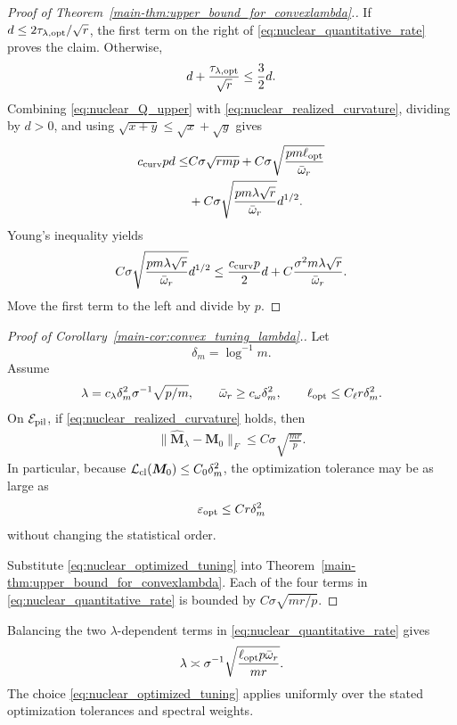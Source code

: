 \documentclass[numsec,webpdf,modern,large,namedate]{oup-authoring-template}
\theoremstyle{plain}
\theoremstyle{remark}
\newcommand{\M}{\bm{M}}
\newif\ifmarkchanges
\newenvironment{revision}{\begingroup\ifmarkchanges\color{red}\fi}{\endgroup}
\begin{document}
\begin{revision}
\begin{proof}[Proof of Theorem~\ref{main-thm:upper_bound_for_convexlambda}.]
If
$d\le2\tau_{\lambda,\rm opt}/\sqrt r$, the first term on the right of
\eqref{eq:nuclear_quantitative_rate} proves the claim.  Otherwise,
\[
 d+\frac{\tau_{\lambda,\rm opt}}{\sqrt r}
 \le
 \frac32d.
\]
Combining \eqref{eq:nuclear_Q_upper} with
\eqref{eq:nuclear_realized_curvature}, dividing by $d>0$, and using
$\sqrt{x+y}\le\sqrt x+\sqrt y$ gives
\begin{align*}
 c_{\rm curv}pd
 \le&
 C\sigma\sqrt{rmp}
 +
 C\sigma
 \sqrt{
 \frac{pm\ell_{\rm opt}}
 {\bar\omega_r}
 }\\
 &+
 C\sigma
 \sqrt{
 \frac{pm\lambda\sqrt r}
 {\bar\omega_r}
 }
 d^{1/2}.
\end{align*}
Young's inequality yields
\[
 C\sigma
 \sqrt{
 \frac{pm\lambda\sqrt r}
 {\bar\omega_r}
 }
 d^{1/2}
 \le
 \frac{c_{\rm curv}p}{2}d
 +
 C
 \frac{
 \sigma^2m\lambda\sqrt r
 }{
 \bar\omega_r
 }.
\]
Move the first term to the left and divide by $p$.
\end{proof}

\begin{proof}[Proof of Corollary~\ref{main-cor:convex_tuning_lambda}.]
Let
\[
 \delta_m=\log^{-1}m.
\]
Assume
\begin{align}
\label{eq:nuclear_optimized_tuning}
 \lambda
 =
 c_\lambda\delta_m^2
 \sigma^{-1}\sqrt{p/m},
 \qquad
 \bar\omega_r
 \ge
 c_\omega\delta_m^2,
 \qquad
 \ell_{\rm opt}
 \le
 C_\ell r\delta_m^2.
\end{align}
On $\mathcal E_{\rm pil}$, if
\eqref{eq:nuclear_realized_curvature} holds, then
\begin{align}
\label{eq:nuclear_conditional_rate}
 \|\widehat{\M}_\lambda-\M_0\|_F
 \le
 C\sigma\sqrt{\frac{mr}{p}}.
\end{align}
In particular, because
$\mathcal L_{\rm cl}(\M_0)\le C_0\delta_m^2$, the optimization tolerance may
be as large as
\begin{align}
\label{eq:nuclear_opt_tolerance}
 \varepsilon_{\rm opt}
 \le
 C r\delta_m^2
\end{align}
without changing the statistical order.

Substitute \eqref{eq:nuclear_optimized_tuning} into
Theorem~\ref{main-thm:upper_bound_for_convexlambda}.  Each of the four terms
in \eqref{eq:nuclear_quantitative_rate} is bounded by
$C\sigma\sqrt{mr/p}$.
\end{proof}

Balancing the two $\lambda$-dependent terms in
\eqref{eq:nuclear_quantitative_rate} gives
\[
 \lambda\asymp\sigma^{-1}
 \sqrt{\frac{\ell_{\rm opt}p\bar\omega_r}{mr}}.
\]
The choice \eqref{eq:nuclear_optimized_tuning} applies uniformly over the
stated optimization tolerances and spectral weights.


\end{revision}
\end{document}
